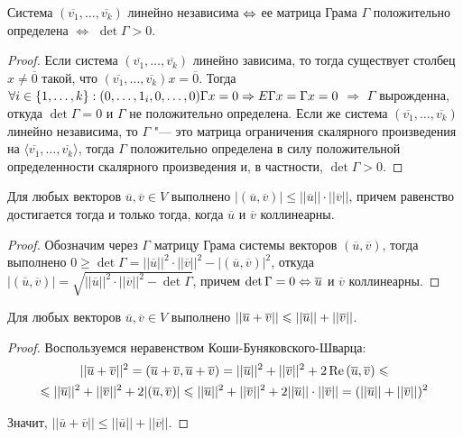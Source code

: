 \begin{theorem}
	Система $(\overline{v_1}, \dots, \overline{v_k})$ линейно независима $\Leftrightarrow$ ее матрица Грама $\Gamma$ положительно определена $\Leftrightarrow$ $\det{\Gamma} > 0$.
\end{theorem}

\begin{proof}
	Если система $(\overline{v_1}, \dots, \overline{v_k})$ линейно зависима, то тогда существует столбец $x \ne \overline0$ такой, что $(\overline{v_1}, \dots, \overline{v_k})x = \overline{0}$. Тогда $\forall i \in \{1, \dots, k\}: (0, \dotsc, 1_i, 0, \dotsc, 0)\Gamma x = 0 \hm\Rightarrow E\Gamma x = \Gamma x = 0$ $\Rightarrow$ $\Gamma$ вырожденна, откуда $\det{\Gamma} = 0$ и $\Gamma$ не положительно определена. Если же система $(\overline{v_1}, \dots, \overline{v_k})$ линейно независима, то $\Gamma$ "--- это матрица ограничения скалярного произведения на $\langle\overline{v_1}, \dots, \overline{v_k}\rangle$, тогда $\Gamma$ положительно определена в силу положительной определенности скалярного произведения и, в частности, $\det{\Gamma} > 0$.
\end{proof}

\begin{theorem}
	Для любых векторов $\overline{u}, \overline{v} \in V$ выполнено $|(\overline{u}, \overline{v})| \le ||\overline{u}||\cdot||\overline{v}||$, причем равенство достигается тогда и только тогда, когда $\overline{u}$ и $\overline{v}$ коллинеарны.
\end{theorem}

\begin{proof}
	Обозначим через $\Gamma$ матрицу Грама системы векторов $(\overline{u}, \overline{v})$, тогда выполнено $0 \ge \det{\Gamma} = ||\overline{u}||^2\cdot||\overline{v}||^2 - |(\overline{u}, \overline{v})|^2$, откуда $|(\overline{u}, \overline{v})| = \sqrt{||\overline{u}||^2\cdot||\overline{v}||^2 - \det{\Gamma}}$, причем $\det{\Gamma} = 0 \Leftrightarrow \overline{u}$ и $\overline{v}$ коллинеарны.
\end{proof}

\begin{theorem}
	Для любых векторов $\overline{u}, \overline{v} \in V$ выполнено $||\overline{u} + \overline{v}|| \le ||\overline{u}|| \hm{+} ||\overline{v}||$.
\end{theorem}

\begin{proof}
	Воспользуемся неравенством Коши-Буняковского-Шварца:
	\begin{multline*}
		||\overline{u} + \overline{v}||^2 = (\overline{u} + \overline{v}, \overline{u} + \overline{v}) = ||\overline{u}||^2 + ||\overline{v}||^2 + 2\re{(\overline{u}, \overline{v})} \le
		\\
		\le ||\overline{u}||^2 + ||\overline{v}||^2 + 2|{(\overline{u}, \overline{v})}| \le ||\overline{u}||^2 + ||\overline{v}||^2 + 2||\overline{u}||\cdot||\overline{v}|| = (||\overline{u}|| \hm{+} ||\overline{v}||)^2
	\end{multline*}
	
	Значит, $||\overline{u} + \overline{v}|| \le ||\overline{u}|| + ||\overline{v}||$.
\end{proof}

